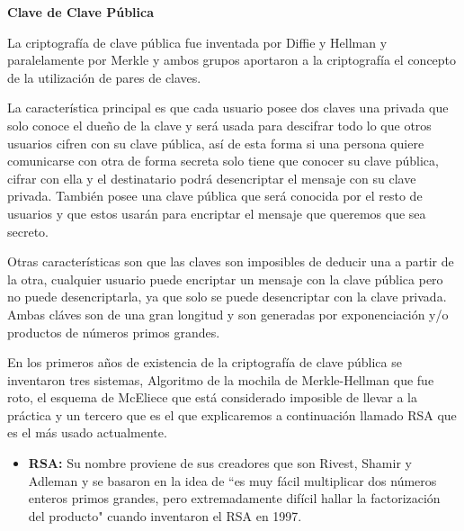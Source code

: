 \textbf{Clave de Clave Pública}

La criptografía de clave pública fue inventada por Diffie y Hellman y paralelamente por Merkle y ambos grupos aportaron a la criptografía el concepto de la utilización de pares de claves.

La característica principal es que cada usuario posee dos claves una privada que solo conoce el dueño de la clave y será usada para descifrar todo lo que otros usuarios cifren con su clave pública, así de esta forma si una persona quiere comunicarse con otra de forma secreta solo tiene que conocer su clave pública, cifrar con ella y el destinatario podrá desencriptar el mensaje con su clave privada. También posee una clave pública que será conocida por el resto de usuarios y que estos usarán para encriptar el mensaje que queremos que sea secreto. 

Otras características son que las claves son imposibles de deducir una a partir de la otra, cualquier usuario puede encriptar un mensaje con la clave pública pero no puede desencriptarla, ya que solo se puede desencriptar con la clave privada. Ambas cláves son de una gran longitud y son generadas por exponenciación y/o productos de números primos grandes.

En los primeros años de existencia de la criptografía de clave pública se inventaron tres sistemas, Algoritmo de la mochila de Merkle-Hellman que fue roto, el esquema de McEliece que está considerado imposible de llevar a la práctica y un tercero que es el que explicaremos a continuación llamado RSA que es el más usado actualmente.

\begin{itemize}

	\item \textbf{RSA:} Su nombre proviene de sus creadores que son Rivest, Shamir y Adleman y se basaron en la idea de ``es muy fácil multiplicar dos números enteros primos grandes, pero extremadamente difícil hallar la factorización del producto" cuando inventaron el RSA en 1997.



\end{itemize}







